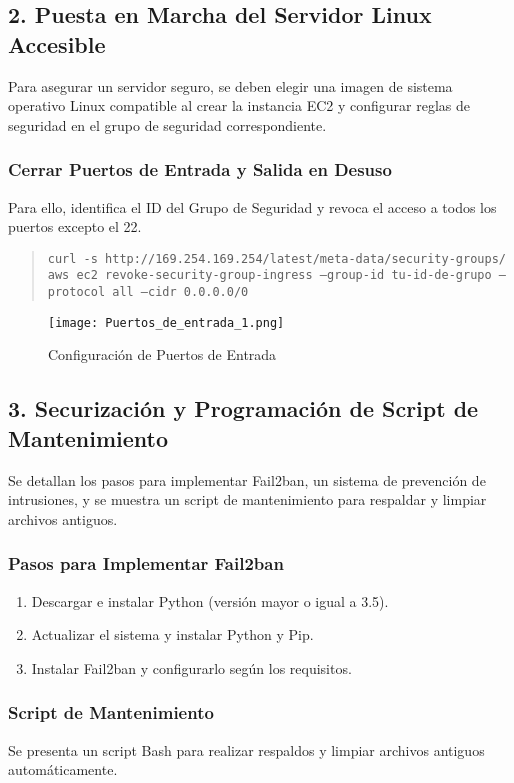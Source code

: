 \documentclass{article}
\begin{document}
\subsection{2. Puesta en Marcha del Servidor Linux Accesible}
Para asegurar un servidor seguro, se deben elegir una imagen de sistema operativo Linux compatible al crear la instancia EC2 y configurar reglas de seguridad en el grupo de seguridad correspondiente.

\subsubsection{Cerrar Puertos de Entrada y Salida en Desuso}
Para ello, identifica el ID del Grupo de Seguridad y revoca el acceso a todos los puertos excepto el 22.

\begin{quote}
\texttt{curl -s http://169.254.169.254/latest/meta-data/security-groups/} \\
\texttt{aws ec2 revoke-security-group-ingress --group-id tu-id-de-grupo --protocol all --cidr 0.0.0.0/0}
\end{quote}

\begin{figure}[ht]
  \centering
  \texttt{[image: Puertos\_de\_entrada\_1.png]}
  \caption{Configuración de Puertos de Entrada}
\end{figure}

\subsection{3. Securización y Programación de Script de Mantenimiento}
Se detallan los pasos para implementar Fail2ban, un sistema de prevención de intrusiones, y se muestra un script de mantenimiento para respaldar y limpiar archivos antiguos.

\subsubsection{Pasos para Implementar Fail2ban}
\begin{enumerate}
  \item Descargar e instalar Python (versión mayor o igual a 3.5).
  \item Actualizar el sistema y instalar Python y Pip.
  \item Instalar Fail2ban y configurarlo según los requisitos.
\end{enumerate}

\subsubsection{Script de Mantenimiento}
Se presenta un script Bash para realizar respaldos y limpiar archivos antiguos automáticamente.
\end{document}

